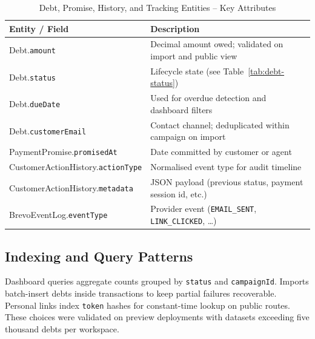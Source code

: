 \documentclass[12pt,a4paper]{report}
\newcommand{\reporttablesetup}{%
  \small%
  \setlength{\tabcolsep}{5pt}%
  \renewcommand{\arraystretch}{1.38}%
  \arrayrulecolor{framegray}%
}
\begin{document}
\begin{table}[H]
  \centering
  \reporttablesetup
  \footnotesize
  \begin{tabularx}{\textwidth}{|p{5.5cm}|Y|}
    \hline
    \textbf{Entity / Field} & \textbf{Description} \\
    \hline
    Debt.\allowbreak\texttt{amount} & Decimal amount owed; validated on import and public view \\
    \hline
    Debt.\allowbreak\texttt{status} & Lifecycle state (see Table~\ref{tab:debt-status}) \\
    \hline
    Debt.\allowbreak\texttt{dueDate} & Used for overdue detection and dashboard filters \\
    \hline
    Debt.\allowbreak\texttt{customerEmail} & Contact channel; deduplicated within campaign on import \\
    \hline
    PaymentPromise.\allowbreak\texttt{promisedAt} & Date committed by customer or agent \\
    \hline
    CustomerActionHistory.\allowbreak\texttt{actionType} & Normalised event type for audit timeline \\
    \hline
    CustomerActionHistory.\allowbreak\texttt{metadata} & JSON payload (previous status, payment session id, etc.) \\
    \hline
    BrevoEventLog.\allowbreak\texttt{eventType} & Provider event (\texttt{EMAIL\_SENT}, \texttt{LINK\_CLICKED}, \ldots) \\
    \hline
  \end{tabularx}
  \caption{Debt, Promise, History, and Tracking Entities -- Key Attributes}
  \label{tab:entity-debt}
\end{table}

\subsection{Indexing and Query Patterns}

Dashboard queries aggregate counts grouped by \texttt{status} and \texttt{campaignId}.
Imports batch-insert debts inside transactions to keep partial failures recoverable.
Personal links index \texttt{token} hashes for constant-time lookup on public routes.
These choices were validated on preview deployments with datasets exceeding five thousand
debts per workspace.
\end{document}
